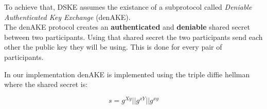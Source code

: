 \begin{frame}
  To achieve that, DSKE assumes the existance of a subprotocol called \emph{Deniable Authenticated Key Exchange} (denAKE).\\[0.3cm]

  The denAKE protocol creates an {\bf authenticated} and {\bf deniable} shared secret between two participants. Using that shared secret the two participants send each other the public key they will be using. This is done for every pair of participants.\\[0.3cm]

  \begin{minipage}{.47\textwidth}
    In our implementation denAKE is implemented using the triple diffie hellman where the shared secret is:

    \[
      s = g^{Xy} || g^{xY} || g^{xy}
    \]

  \end{minipage}
  \begin{minipage}{.47\textwidth}
     \begin{figure}
      \scalebox{0.5}{ }
    \end{figure}
  \end{minipage}
\end{frame}

\begin{frame}
  \begin{figure}
    \scalebox{0.39}{}
  \end{figure}
\end{frame}
